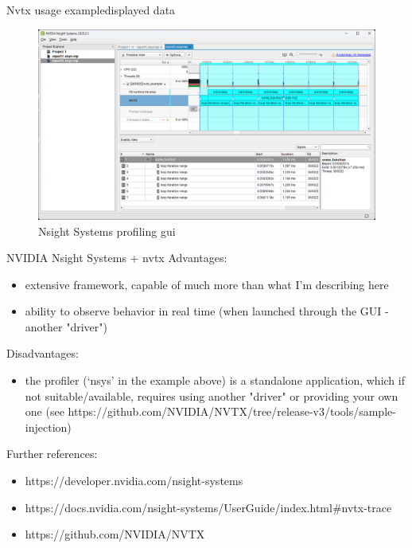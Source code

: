\documentclass[aspectratio=169]{beamer}
\begin{document}
\begin{frame}{Nvtx usage example}{displayed data}

    \begin{figure}[h]
        \centering
        \includegraphics[width=\textwidth,height=0.7\textheight,keepaspectratio]{pics/nvtx/gui.png}
        \caption{Nsight Systems profiling gui}
    \end{figure}

\end{frame}

\begin{frame}{NVIDIA Nsight Systems + nvtx}
    Advantages:

    \begin{itemize}
        \item extensive framework, capable of much more than what I'm describing here
        \item ability to observe behavior in real time (when launched through the GUI - another "driver")
    \end{itemize}

    Disadvantages:

    \begin{itemize}
        \item the profiler (`nsys' in the example above) is a standalone application, which if not suitable/available, requires using another "driver" or providing your own one (see https://github.com/NVIDIA/NVTX/tree/release-v3/tools/sample-injection)
    \end{itemize}

    Further references:

    \begin{itemize}
         \item https://developer.nvidia.com/nsight-systems
         \item https://docs.nvidia.com/nsight-systems/UserGuide/index.html\#nvtx-trace
         \item https://github.com/NVIDIA/NVTX
    \end{itemize}

\end{frame}
\end{document}
